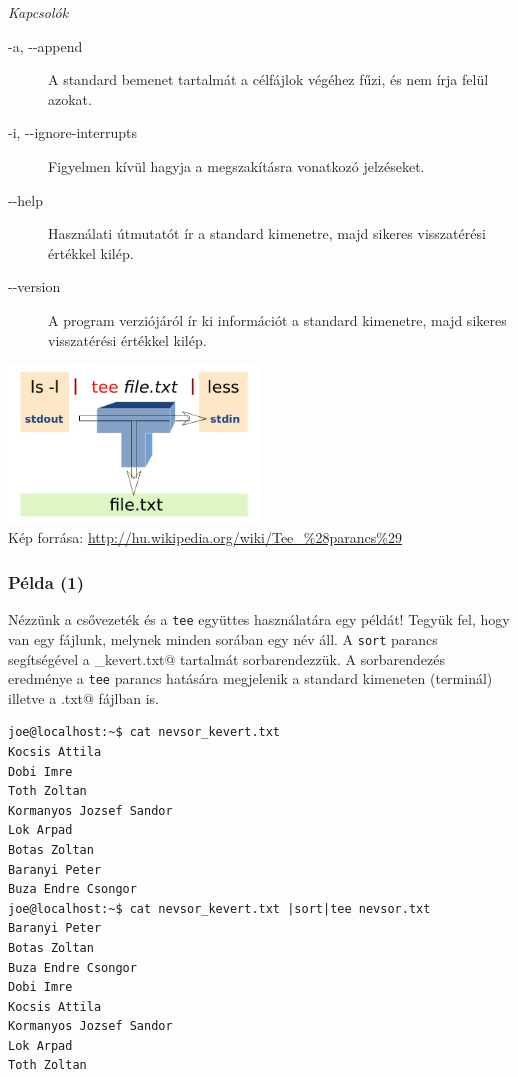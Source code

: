 \textit{Kapcsolók}
\begin{description}
\item[-a, -{}-append] A standard bemenet tartalmát a célfájlok végéhez fűzi, és nem írja felül azokat.
\item[-i, -{}-ignore-interrupts] Figyelmen kívül hagyja a megszakításra vonatkozó jelzéseket.
\item[-{}-help] Használati útmutatót ír a standard kimenetre, majd sikeres visszatérési értékkel kilép.
\item[-{}-version] A program verziójáról ír ki információt a standard kimenetre, majd sikeres visszatérési értékkel kilép.
\end{description}

\begin{center}
\includegraphics[width=0.5\textwidth]{pics/Tee2}\\
\footnotesize
Kép forrása: \url{http://hu.wikipedia.org/wiki/Tee_\%28parancs\%29}
\end{center}

\subsubsection*{Példa (1)}
Nézzünk a csővezeték és a \verb.tee. együttes használatára egy példát! Tegyük fel, hogy van egy fájlunk, melynek minden sorában egy név áll. A \verb.sort. parancs segítségével a \verb@nevsor_kevert.txt@ tartalmát sorbarendezzük. A sorbarendezés eredménye a \verb.tee. parancs hatására megjelenik a standard kimeneten (terminál) illetve a \verb@nevsor.txt@ fájlban is.

\begin{lstlisting}
joe@localhost:~$ cat nevsor_kevert.txt 
Kocsis Attila
Dobi Imre
Toth Zoltan
Kormanyos Jozsef Sandor
Lok Arpad
Botas Zoltan
Baranyi Peter
Buza Endre Csongor
joe@localhost:~$ cat nevsor_kevert.txt |sort|tee nevsor.txt
Baranyi Peter
Botas Zoltan
Buza Endre Csongor
Dobi Imre
Kocsis Attila
Kormanyos Jozsef Sandor
Lok Arpad
Toth Zoltan
\end{lstlisting}


